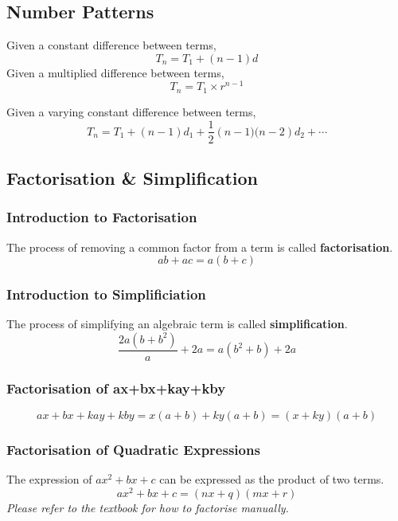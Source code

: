 \documentclass{report}
\begin{document}
\begin{flushleft}
\subsection{Number Patterns}
Given a constant difference between terms,
\begin{equation}
    T_n=T_1+(n-1)d
\end{equation}
Given a multiplied difference between terms,
\begin{equation}
    T_n=T_1\times r^{n-1}
\end{equation}

Given a varying constant difference between terms,
\begin{equation}
    T_n=T_1+(n-1)d_1+\frac{1}{2}\left(n-1)(n-2\right)d_2+\cdots
\end{equation}

\subsection{Factorisation \& Simplification}

\subsubsection{Introduction to Factorisation}
The process of removing a common factor from a term is called \textbf{factorisation}.
\begin{equation}
    ab+ac=a\left(b+c\right)
\end{equation}

\subsubsection{Introduction to Simplificiation}
The process of simplifying an algebraic term is called \textbf{simplification}.
\begin{equation}
    \frac{2a(b+b^2)}{a}+2a = a(b^2+b)+2a
\end{equation}

\subsubsection{Factorisation of ax+bx+kay+kby}
\par
\begin{equation}
    ax+bx+kay+kby = x(a+b)+ky(a+b) = (x+ky)(a+b)
\end{equation}

\subsubsection{Factorisation of Quadratic Expressions}
The expression of $ax^2+bx+c$ can be expressed as the product of two terms.
\begin{equation}
    ax^2+bx+c = (nx+q)(mx+r)
\end{equation}
\textit{Please refer to the textbook for how to factorise manually.}


\end{flushleft}
\end{document}
